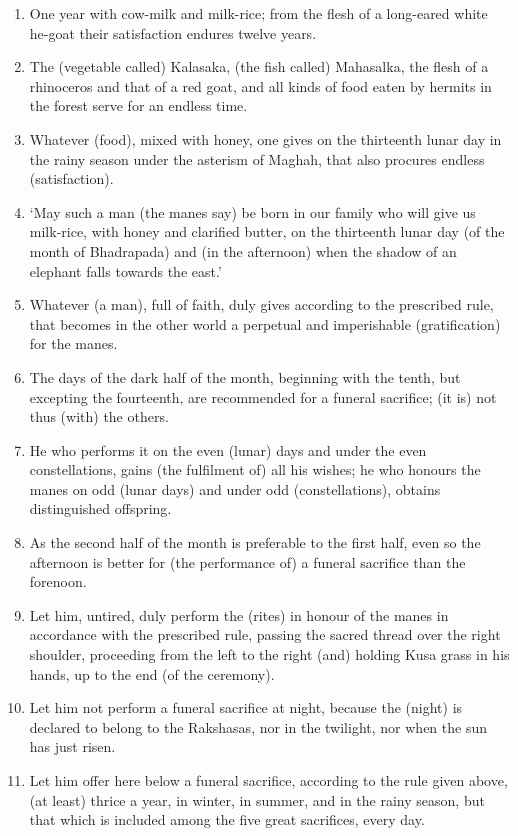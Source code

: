 \begin{enumerate}
\item One year with cow-milk and milk-rice; from the flesh of a long-eared white he-goat their satisfaction endures twelve years.
\item The (vegetable called) Kalasaka, (the fish called) Mahasalka, the flesh of a rhinoceros and that of a red goat, and all kinds of food eaten by hermits in the forest serve for an endless time.
\item Whatever (food), mixed with honey, one gives on the thirteenth lunar day in the rainy season under the asterism of Maghah, that also procures endless (satisfaction).
\item `May such a man (the manes say) be born in our family who will give us milk-rice, with honey and clarified butter, on the thirteenth lunar day (of the month of Bhadrapada) and (in the afternoon) when the shadow of an elephant falls towards the east.'
\item Whatever (a man), full of faith, duly gives according to the prescribed rule, that becomes in the other world a perpetual and imperishable (gratification) for the manes.
\item The days of the dark half of the month, beginning with the tenth, but excepting the fourteenth, are recommended for a funeral sacrifice; (it is) not thus (with) the others.
\item He who performs it on the even (lunar) days and under the even constellations, gains (the fulfilment of) all his wishes; he who honours the manes on odd (lunar days) and under odd (constellations), obtains distinguished offspring.
\item As the second half of the month is preferable to the first half, even so the afternoon is better for (the performance of) a funeral sacrifice than the forenoon.
\item Let him, untired, duly perform the (rites) in honour of the manes in accordance with the prescribed rule, passing the sacred thread over the right shoulder, proceeding from the left to the right (and) holding Kusa grass in his hands, up to the end (of the ceremony).
\item Let him not perform a funeral sacrifice at night, because the (night) is declared to belong to the Rakshasas, nor in the twilight, nor when the sun has just risen.
\item Let him offer here below a funeral sacrifice, according to the rule given above, (at least) thrice a year, in winter, in summer, and in the rainy season, but that which is included among the five great sacrifices, every day.

\end{enumerate}
